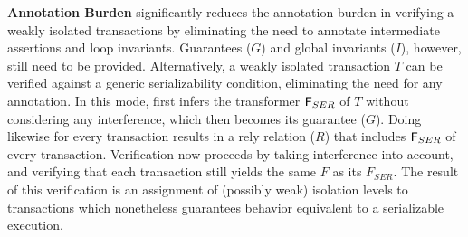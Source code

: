 \textbf{Annotation Burden} \thetool significantly reduces the annotation
burden in verifying a weakly isolated transactions by eliminating the
need to annotate intermediate assertions and loop invariants.
Guarantees ($G$) and global invariants ($I$), however, still need to be
provided. Alternatively, a weakly isolated transaction $T$ can be
verified against a generic serializability condition,  eliminating
the need for any annotation. In this mode, \thetool first infers the
transformer ${\sf F}_{SER}$ of $T$ without considering any interference,
which then becomes its guarantee ($G$). Doing likewise for every
transaction results in a rely relation ($R$) that includes ${\sf F}_{SER}$
of every transaction. Verification now proceeds by taking interference
into account, and verifying that each transaction still yields the
same $F$ as its $F_{SER}$. The result of this verification is an
assignment of (possibly weak) isolation levels to transactions which
nonetheless guarantees behavior equivalent to a  serializable execution.



